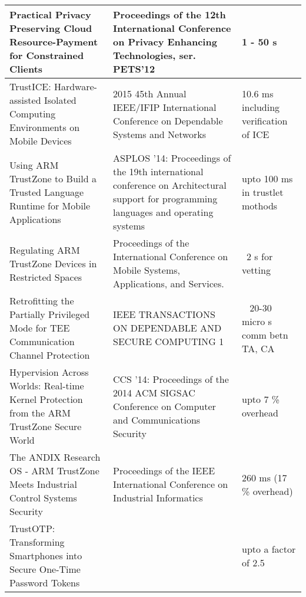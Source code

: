 \documentclass[conference]{IEEEtran}
\begin{document}
\begin{table*}[t]
\begin{center}
\begin{tabular}{ |p{}||p{}|p{}|  }
            Practical Privacy Preserving Cloud Resource-Payment for Constrained Clients                & Proceedings of the 12th International Conference on Privacy Enhancing Technologies, ser. PETS’12                                      & 1 - 50 s                                                     \\ \hline
            TrustICE: Hardware-assisted Isolated Computing Environments on Mobile Devices              & 2015 45th Annual IEEE/IFIP International Conference on Dependable Systems and Networks                                                & 10.6 ms including verification of ICE                        \\ \hline
            Using ARM TrustZone to Build a Trusted Language Runtime for Mobile Applications            & ASPLOS '14: Proceedings of the 19th international conference on Architectural support for programming languages and operating systems & upto 100 ms in trustlet mothods                              \\ \hline
            Regulating ARM TrustZone Devices in Restricted Spaces                                      & Proceedings of the International Conference on Mobile Systems, Applications, and Services.                                            & ~2 s for vetting                                             \\ \hline
            Retrofitting the Partially Privileged Mode for TEE Communication Channel Protection        & IEEE TRANSACTIONS ON DEPENDABLE AND SECURE COMPUTING 1                                                                                & ~ 20-30 micro s comm betn TA, CA                             \\ \hline
            Hypervision Across Worlds: Real-time Kernel Protection from the ARM TrustZone Secure World & CCS '14: Proceedings of the 2014 ACM SIGSAC Conference on Computer and Communications Security                                        & upto 7 \% overhead                                           \\ \hline
            The ANDIX Research OS - ARM TrustZone Meets Industrial Control Systems Security            & Proceedings of the IEEE International Conference on Industrial Informatics                                                            & 260 ms (17 \% overhead)                                      \\ \hline
            TrustOTP: Transforming Smartphones into Secure One-Time Password Tokens                    &                                                                                                                                       & upto a factor of 2.5                                         \\ \hline

\end{tabular}
\end{center}
\end{table*}
\end{document}
